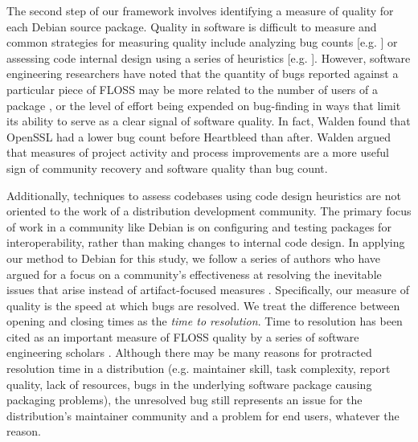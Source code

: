 \documentclass[10pt,conference]{IEEEtran}\usepackage[]{graphicx}\usepackage[usenames,dvipsnames]{color}
\begin{document}
The second step of our framework involves identifying a measure of quality for each Debian source package. Quality in software is difficult to measure and common strategies for measuring quality include analyzing bug counts [e.g. ] or assessing code internal design using a series of heuristics [e.g. ]. However, software engineering researchers have noted that the quantity of bugs reported against a particular piece of FLOSS may be more related to the number of users of a package \cite{herraiz_impact_2011, davies_perspectives_2010}, or the level of effort being expended on bug-finding \cite{walden_impact_2020} in ways that limit its ability to serve as a clear signal of software quality. In fact, Walden \cite{walden_impact_2020} found that OpenSSL had a lower bug count before Heartbleed than after.
Walden \cite{walden_impact_2020} argued that measures of project activity and process improvements are a more useful sign of community recovery and software quality than bug count. %

Additionally, techniques to assess codebases using code design heuristics are not oriented to the work of a distribution development community. The primary focus of work in a community like Debian is on configuring and testing packages for interoperability, rather than making changes to internal code design. %
In applying our method to Debian for this study, we follow a series of authors who have argued for a focus on a community's effectiveness at resolving the inevitable issues that arise instead of artifact-focused measures \cite{eghbal_working_2020, ronchieri_metrics_2018, adewumi_systematic_2016, crowston_free/libre_2012, ruiz_measuring_2011, aksulu_comprehensive_2010}. 
Specifically, our measure of quality is the speed at which bugs are resolved. We treat the difference between opening and closing times as the \textit{time to resolution}. Time to resolution has been cited as an important measure of FLOSS quality by a series of software engineering scholars \cite{eghbal_working_2020, abou_khalil_longitudinal_2019, crowston_free/libre_2012, kim_how_2006}. Although there may be many reasons for protracted resolution time in a distribution (e.g. maintainer skill, task complexity, report quality, lack of resources, bugs in the underlying software package causing packaging problems), the unresolved bug still represents an issue for the distribution's maintainer community and a problem for end users, whatever the reason.
\end{document}
